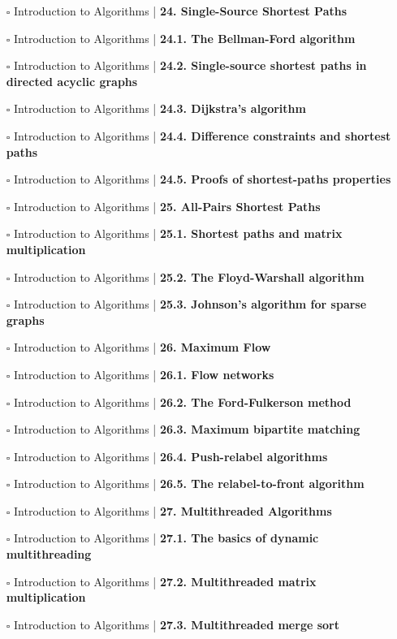 \documentclass[a4, landscape, 12pt]{article}
\newcommand{\checkbox}{$\square$}%
\begin{document}
\begin{itemize}
{}
\item [\checkbox]  Introduction to Algorithms | \textbf{ 24. Single-Source Shortest Paths
}
\item [\checkbox]  Introduction to Algorithms | \textbf{ 24.1. The Bellman-Ford algorithm
}
\item [\checkbox]  Introduction to Algorithms | \textbf{ 24.2. Single-source shortest paths in directed acyclic graphs
}
\item [\checkbox]  Introduction to Algorithms | \textbf{ 24.3. Dijkstra’s algorithm
}
\item [\checkbox]  Introduction to Algorithms | \textbf{ 24.4. Difference constraints and shortest paths
}
\item [\checkbox]  Introduction to Algorithms | \textbf{ 24.5. Proofs of shortest-paths properties
}
\item [\checkbox]  Introduction to Algorithms | \textbf{ 25. All-Pairs Shortest Paths
}
\item [\checkbox]  Introduction to Algorithms | \textbf{ 25.1. Shortest paths and matrix multiplication
}
\item [\checkbox]  Introduction to Algorithms | \textbf{ 25.2. The Floyd-Warshall algorithm
}
\item [\checkbox]  Introduction to Algorithms | \textbf{ 25.3. Johnson’s algorithm for sparse graphs
}
\item [\checkbox]  Introduction to Algorithms | \textbf{ 26. Maximum Flow
}
\item [\checkbox]  Introduction to Algorithms | \textbf{ 26.1. Flow networks
}
\item [\checkbox]  Introduction to Algorithms | \textbf{ 26.2. The Ford-Fulkerson method
}
\item [\checkbox]  Introduction to Algorithms | \textbf{ 26.3. Maximum bipartite matching
}
\item [\checkbox]  Introduction to Algorithms | \textbf{ 26.4. Push-relabel algorithms
}
\item [\checkbox]  Introduction to Algorithms | \textbf{ 26.5. The relabel-to-front algorithm
}
\item [\checkbox]  Introduction to Algorithms | \textbf{ 27. Multithreaded Algorithms
}
\item [\checkbox]  Introduction to Algorithms | \textbf{ 27.1. The basics of dynamic multithreading
}
\item [\checkbox]  Introduction to Algorithms | \textbf{ 27.2. Multithreaded matrix multiplication
}
\item [\checkbox]  Introduction to Algorithms | \textbf{ 27.3. Multithreaded merge sort
}
\end{itemize}
\end{document}
